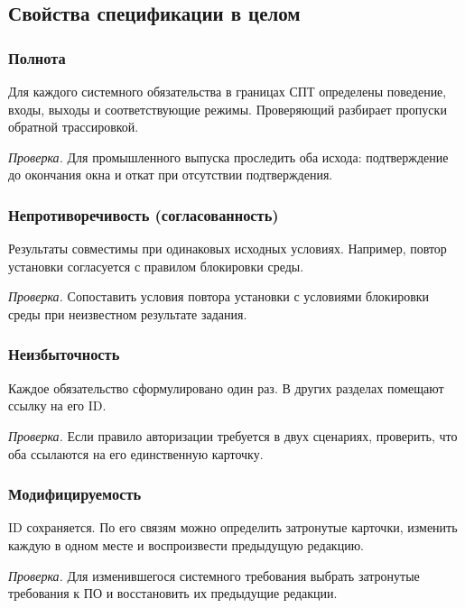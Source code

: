 \documentclass{tpks}
\begin{document}
\subsection{Свойства спецификации в целом}

\subsubsection{Полнота}
Для каждого системного обязательства в границах СПТ определены поведение, входы, выходы и соответствующие режимы. Проверяющий разбирает пропуски обратной трассировкой.

\textit{Проверка.} Для промышленного выпуска проследить оба исхода: подтверждение до окончания окна и откат при отсутствии подтверждения.
\subsubsection{Непротиворечивость (согласованность)}
Результаты совместимы при одинаковых исходных условиях. Например, повтор установки согласуется с правилом блокировки среды.

\textit{Проверка.} Сопоставить условия повтора установки с условиями блокировки среды при неизвестном результате задания.
\subsubsection{Неизбыточность}
Каждое обязательство сформулировано один раз. В других разделах помещают ссылку на его ID.

\textit{Проверка.} Если правило авторизации требуется в двух сценариях, проверить, что оба ссылаются на его единственную карточку.
\subsubsection{Модифицируемость}
ID сохраняется. По его связям можно определить затронутые карточки, изменить каждую в одном месте и воспроизвести предыдущую редакцию.

\textit{Проверка.} Для изменившегося системного требования выбрать затронутые требования к ПО и восстановить их предыдущие редакции.
\end{document}
